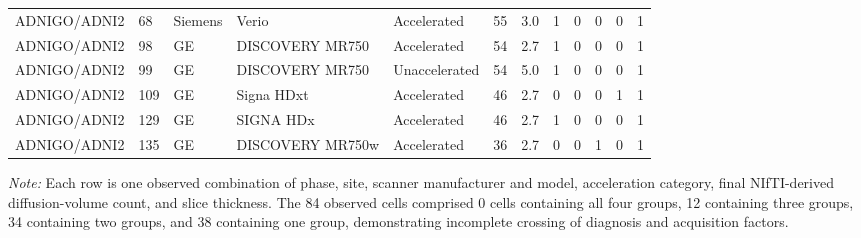 \documentclass{article}
\begin{document}
\begin{landscape}
\begin{longtable}{lllllrrrrrrr}
ADNIGO/ADNI2 & 68 & Siemens & Verio & Accelerated & 55 & 3.0 & 1 & 0 & 0 & 0 & 1 \\
ADNIGO/ADNI2 & 98 & GE & DISCOVERY MR750 & Accelerated & 54 & 2.7 & 1 & 0 & 0 & 0 & 1 \\
ADNIGO/ADNI2 & 99 & GE & DISCOVERY MR750 & Unaccelerated & 54 & 5.0 & 1 & 0 & 0 & 0 & 1 \\
ADNIGO/ADNI2 & 109 & GE & Signa HDxt & Accelerated & 46 & 2.7 & 0 & 0 & 0 & 1 & 1 \\
ADNIGO/ADNI2 & 129 & GE & SIGNA HDx & Accelerated & 46 & 2.7 & 1 & 0 & 0 & 0 & 1 \\
ADNIGO/ADNI2 & 135 & GE & DISCOVERY MR750w & Accelerated & 36 & 2.7 & 0 & 0 & 1 & 0 & 1 \\
\end{longtable}
\footnotesize\textit{Note:} Each row is one observed combination of phase, site, scanner manufacturer and model, acceleration category, final NIfTI-derived diffusion-volume count, and slice thickness. The 84 observed cells comprised 0 cells containing all four groups, 12 containing three groups, 34 containing two groups, and 38 containing one group, demonstrating incomplete crossing of diagnosis and acquisition factors.
\end{landscape}
\end{document}

